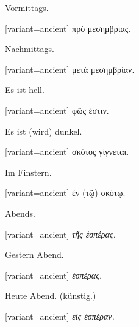 Vormittags.

\switchcolumn

\begin{greek}[variant=ancient]%
πρὸ μεσημβρίας.

\end{greek}%
\switchcolumn*

Nachmittags.

\switchcolumn

\begin{greek}[variant=ancient]%
μετὰ μεσημβρίαν.

\end{greek}%
\switchcolumn*

Es ist hell.

\switchcolumn

\begin{greek}[variant=ancient]%
φῶς ἐστιν.

\end{greek}%
\switchcolumn*

Es ist (wird) dunkel.

\switchcolumn

\begin{greek}[variant=ancient]%
σκότος γίγνεται.

\end{greek}%
\switchcolumn*

Im Finstern.

\switchcolumn

\begin{greek}[variant=ancient]%
ἐν (τῷ) σκότῳ.

\end{greek}%
\switchcolumn*

Abends.

\switchcolumn

\begin{greek}[variant=ancient]%
\emph{τῆς ἑσπέρας.}

\end{greek}%
\switchcolumn*

Gestern Abend.

\switchcolumn

\begin{greek}[variant=ancient]%
\emph{ἑσπέρας.}

\end{greek}%
\switchcolumn*

Heute Abend. (künstig.)

\switchcolumn

\begin{greek}[variant=ancient]%
\emph{εἰς ἑσπέραν.}

\end{greek}%
\switchcolumn*

